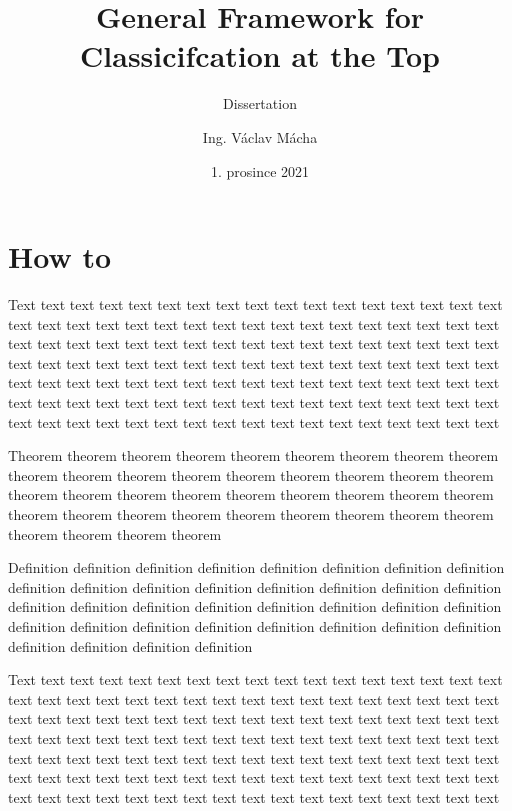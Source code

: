 \documentclass{Thesis}
\title{General Framework for Classicifcation at the Top}
\subtitle{Dissertation}
\author{Ing. Václav Mácha}
\date{1. prosince 2021}
\begin{document}
\maketitle

\chapter*{How to}

Text text text text text text text text text text text text text text text text text text text text text text text text text text text text text text text text text text text text text text text text text text text text text text text text text text text text text text text text text text text text text text text text text text text text text text text text text text text text text text text text text text text text text text text text text text text text text text text text text text text text text text text text text text text text text text text text text text text text text text text

\begin{theorem}
  Theorem theorem  theorem theorem theorem theorem theorem theorem theorem theorem theorem theorem theorem theorem theorem theorem theorem theorem theorem theorem theorem theorem theorem theorem theorem theorem theorem theorem theorem theorem theorem theorem theorem theorem theorem theorem theorem theorem theorem theorem
\end{theorem}

\begin{definition}
  Definition definition definition definition definition definition definition definition definition definition definition definition definition definition definition definition definition definition definition definition definition definition definition definition definition definition definition definition definition definition definition definition definition definition definition definition
\end{definition}

Text text text text text text text text text text text text text text text text text text text text text text text text text text text text text text text text text text text text text text text text text text text text text text text text text text text text text text text text text text text text text text text text text text text text text text text text text text text text text text text text text text text text text text text text text text text text text text text text text text text text text text text text text text text text text text text text text text text text text text text
\end{document}
